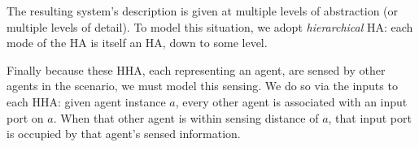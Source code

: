 The resulting system's description is given at multiple levels of abstraction (or multiple levels of detail). 
To model this situation, we adopt \emph{hierarchical} HA: each mode of the HA is itself an HA, down to some level.

Finally because these HHA, each representing an agent, are sensed by other agents in the scenario, we must model this sensing. 
We do so via the inputs to each HHA: given agent instance $a$, every other agent is associated with an input port on $a$.
When that other agent is within sensing distance of $a$, that input port is occupied by that agent's sensed information.


